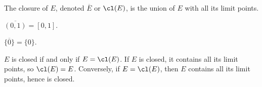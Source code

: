 \begin{definition}[Closure]
    The closure of $E$, denoted $\overline{E}$ or $\cl(E)$, is the union of $E$ with all its limit points.
\end{definition}

\begin{example}
    $\overline{(0,1)} = [0,1]$.

    $\overline{\{0\}} = \{0\}$.
\end{example}

\begin{proposition}{
    $E$ is closed if and only if $E = \cl(E)$.
}
              If $E$ is closed, it contains all its limit points, so $\cl(E)=E$.
              Conversely, if $E=\cl(E)$, then $E$ contains all its limit points, hence is closed.
\end{proposition}